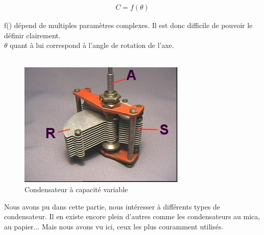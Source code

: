 \begin{align}
    C=f(\theta)
\end{align}

f() dépend de multiples paramètres complexes. Il est donc difficile de pouvoir le définir clairement.\\
$\theta$ quant à lui correspond à l'angle de rotation de l'axe. \\ \\

\begin{figure}[!h]
    \centering
    \includegraphics[scale=0.8]{./picture4/condo_variable.jpg}
    \caption{Condensateur à capacité variable}
\end{figure}


Nous avons pu dans cette partie, nous intéresser à différents types de condensateur. Il en existe encore plein d'autres comme les condensateurs au mica, au papier... Mais nous avons vu ici, ceux les plus couramment utilisés.

